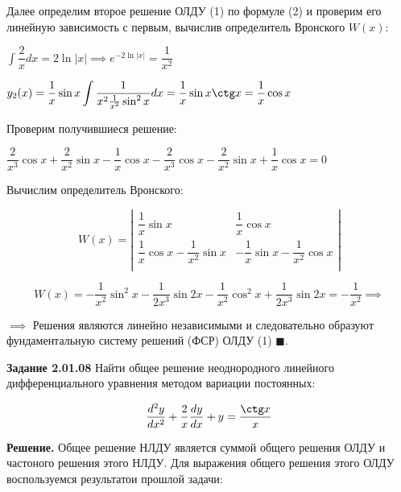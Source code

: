 \documentclass[a4paper, 12pt]{article}
\begin{document}
	\quad Далее определим второе решение ОЛДУ (1) по формуле (2) и проверим его линейную зависимость с первым, вычислив определитель Вронского $W(x)$:
	
	\begin{center}
		$\displaystyle\int\dfrac{2}{x}dx = 2\ln|x| \implies e^{-2\ln|x|} = \dfrac{1}{x^2}$

		$y_2(x) = \dfrac{1}{x}\sin x \displaystyle\int\dfrac{1}{x^2 \frac{1}{x^2} \sin^2 x} dx = \dfrac{1}{x}\sin x \ctg x = \dfrac{1}{x}\cos x $
	\end{center}
	
	\quad Проверим получившиеся решение: 
	
	\begin{center} 
		$\dfrac{2}{x^3} \cos x + \dfrac{2}{x^2}\sin x - \dfrac{1}{x}\cos x - \dfrac{2}{x^3}\cos x - \dfrac{2}{x^2}\sin x + \dfrac{1}{x}\cos x = 0 $
	\end{center}
	
	\quad Вычислим определитель Вронского:
	
	\begin{equation}
		W(x) = \left|\begin{array}{cc}
			\dfrac{1}{x}\sin x & \dfrac{1}{x}\cos x \\
			\dfrac{1}{x}\cos x - \dfrac{1}{x^2} \sin x & -\dfrac{1}{x}\sin x - \dfrac{1}{x^2}\cos x \\
		\end{array}\right|
	\end{equation}
	
	\begin{equation}
		W(x) = -\dfrac{1}{x^2}\sin^2 x - \dfrac{1}{2x^3}\sin2x - \dfrac{1}{x^2}\cos^2 x + \dfrac{1}{2x^3}\sin 2x = -\dfrac{1}{x^2}\implies 
	\end{equation}
	
	\quad $\implies $ Решения являются линейно независимыми и следовательно образуют фундаментальную систему решений (ФСР) ОЛДУ (1) $\blacksquare$.
		
	\quad \textbf{Задание 2.01.08} Найти общее решение неоднородного линейного дифференциального уравнения методом вариации постоянных: 
	
	\begin{equation}
		\dfrac{d^2 y}{dx^2} + \dfrac{2}{x} \dfrac{dy}{dx} + y = \dfrac{ \ctg x }{x}
	\end{equation} 
	
	\quad \textbf{Решение.} Общее решение НЛДУ является суммой общего решения ОЛДУ и частоного решения этого НЛДУ. Для выражения общего решения этого ОЛДУ воспользуемся результатои прошлой задачи:
	
\end{document}
